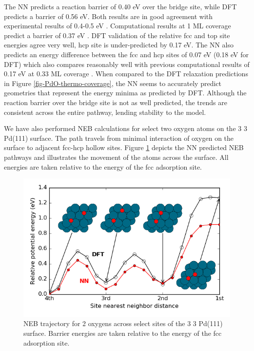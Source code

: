 \documentclass[12pt]{cmuthesis}
\begin{document}
The NN predicts a reaction barrier of 0.40 eV over the bridge site, while DFT predicts a barrier of 0.56 eV. Both results are in good agreement with experimental results of 0.4-0.5 eV \cite{rose-2004-chemis-atomic}. Computational results at 1 ML coverage predict a barrier of 0.37 eV \cite{markovits-2008-move-stron}. DFT validation of the relative fcc and top site energies agree very well, hcp site is under-predicted by 0.17 eV. The NN also predicts an energy difference between the fcc and hcp sites of 0.07 eV (0.18 eV for DFT) which also compares reasonably well with previous computational results of 0.17 eV at 0.33 ML coverage \cite{honkala-2001-ab-initio}. When compared to the DFT relaxation predictions in Figure \ref{fig-PdO-thermo-coverage}, the NN seems to accurately predict geometries that represent the energy minima as predicted by DFT. Although the reaction barrier over the bridge site is not as well predicted, the trends are consistent across the entire pathway, lending stability to the model.

We have also performed NEB calculations for select two oxygen atoms on the 3 \texttimes{} 3 Pd(111) surface. The path travels from minimal interaction of oxygen on the surface to adjacent fcc-hcp hollow sites. Figure \ref{fig-PdO2-NEB} depicts the NN predicted NEB pathways and illustrates the movement of the atoms across the surface.  All energies are taken relative to the energy of the fcc adsorption site.

\begin{figure}[htbp]
\centering
\includegraphics[width=5in]{./images/PdO2-NEB.png}
\caption{\label{fig-PdO2-NEB}
NEB trajectory for 2 oxygens across select sites of the 3 \texttimes{} 3 Pd(111) surface. Barrier energies are taken relative to the energy of the fcc adsorption site.}
\end{figure}
\end{document}
